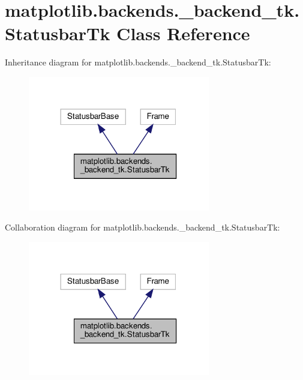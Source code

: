 \hypertarget{classmatplotlib_1_1backends_1_1__backend__tk_1_1StatusbarTk}{}\section{matplotlib.\+backends.\+\_\+backend\+\_\+tk.\+Statusbar\+Tk Class Reference}
\label{classmatplotlib_1_1backends_1_1__backend__tk_1_1StatusbarTk}


Inheritance diagram for matplotlib.\+backends.\+\_\+backend\+\_\+tk.\+Statusbar\+Tk\+:
\nopagebreak
\begin{figure}[H]
\begin{center}
\leavevmode
\includegraphics[width=225pt]{classmatplotlib_1_1backends_1_1__backend__tk_1_1StatusbarTk__inherit__graph}
\end{center}
\end{figure}


Collaboration diagram for matplotlib.\+backends.\+\_\+backend\+\_\+tk.\+Statusbar\+Tk\+:
\nopagebreak
\begin{figure}[H]
\begin{center}
\leavevmode
\includegraphics[width=225pt]{classmatplotlib_1_1backends_1_1__backend__tk_1_1StatusbarTk__coll__graph}
\end{center}
\end{figure}
